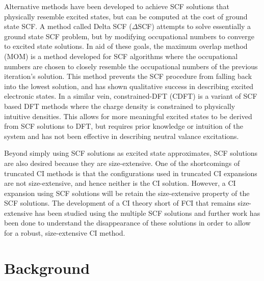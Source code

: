 \documentclass[final,3p,times,twocolumn]{elsarticle}
\begin{document}
Alternative methods have been developed to achieve SCF solutions that physically resemble excited states, but can be computed at the cost of ground state SCF. A method called Delta SCF ($\Delta$SCF) attempts to solve essentially a ground state SCF problem, but by modifying occupational numbers to converge to excited state solutions.\cite{gunnarsson-1977,gavnholt-2008} In aid of these goals, the maximum overlap method (MOM) is a method developed for SCF algorithms where the occupational numbers are chosen to closely resemble the occupational numbers of the previous iteration's solution.\cite{mom} This method prevents the SCF procedure from falling back into the lowest solution, and has shown qualitative success in describing excited electronic states. In a similar vein, constrained-DFT (CDFT) is a variant of SCF based DFT methods where the charge density is constrained to physically intuitive densities.\cite{cdft} This allows for more meaningful excited states to be derived from SCF solutions to DFT, but requires prior knowledge or intuition of the system and has not been effective in describing neutral valance excitations.

Beyond simply using SCF solutions as excited state approximates, SCF solutions are also desired because they are size-extensive. One of the shortcomings of truncated CI methods\cite{shavitt} is that the configurations used in truncated CI expansions are not size-extensive, and hence neither is the CI solution. However, a CI expansion using SCF solutions will be retain the size-extensive property of the SCF solutions. The development of a CI theory short of FCI that remains size-extensive has been studied using the multiple SCF solutions\cite{thom-2009} and further work has been done to understand the disappearance of these solutions in order to allow for a robust, size-extensive CI method.\cite{thom-2014,thom-2016}

\section{Background}
\end{document}
